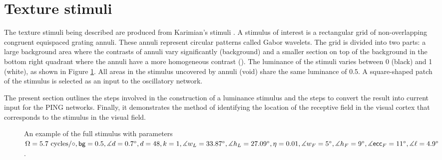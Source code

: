 \section{Texture stimuli}
\label{sec:external-stimuli}

The texture stimuli being described are produced from Karimian's stimuli \cite{MaryamPLACEHOLDER}. A stimulus of interest is a rectangular grid of non-overlapping congruent equispaced grating annuli. These annuli represent circular patterns called Gabor wavelets. The grid is divided into two parts: a large background area where the contrasts of annuli vary significantly (background) and a smaller section on top of the background in the bottom right quadrant where the annuli have a more homogeneous contrast (\stimfig). The luminance of the stimuli varies between 0 (black) and 1 (white), as shown in Figure \ref{fig:full-stimulus-example}. All areas in the stimulus uncovered by annuli (void) share the same luminance of 0.5. A square-shaped patch of the stimulus \stimfig{} is selected as an input to the oscillatory network.

The present section outlines the steps involved in the construction of a luminance stimulus and the steps to convert the result into current input for the PING networks. Finally, it demonstrates the method of identifying the location of the receptive field in the visual cortex that corresponds to the stimulus in the visual field.

\begin{figure}[!htp]
    \centering
    
    \caption[Full stimulus annotated]{An example of the full stimulus with parameters $ \Omega = 5.7 \text{ cycles}/\circ, \mathsf{bg} = 0.5, \measuredangle d = 0.7^\circ, d = 48, k = 1, \measuredangle w_L = 33.87^\circ, \measuredangle h_L = 27.09^\circ, \eta = 0.01, \measuredangle w_F = 5^\circ, \measuredangle h_F = 9^\circ, \measuredangle \mathsf{ecc}_F = 11^\circ, \measuredangle \ell = 4.9^\circ$.}
    \label{fig:full-stimulus-example}
\end{figure}



